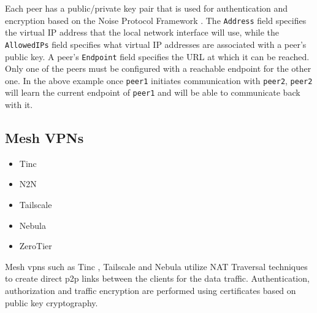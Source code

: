Each peer has a public/private key pair that is used for authentication
and encryption based on the Noise Protocol Framework
\autocite{noiseDocs}. The \texttt{Address} field specifies the virtual
IP address that the local network interface will use, while the
\texttt{AllowedIPs} field specifies what virtual IP addresses are
associated with a peer's public key. A peer's \texttt{Endpoint} field
specifies the URL at which it can be reached. Only one of the peers must
be configured with a reachable endpoint for the other one. In the above
example once \texttt{peer1} initiates communication with \texttt{peer2},
\texttt{peer2} will learn the current endpoint of \texttt{peer1} and
will be able to communicate back with it.

\hypertarget{thesis__020-related-work.md__mesh-vpns}{%
\subsection{Mesh VPNs}\label{thesis__020-related-work.md__mesh-vpns}}

\begin{itemize}
\tightlist
\item
  Tinc
\item
  N2N
\item
  Tailscale
\item
  Nebula
\item
  ZeroTier
\end{itemize}

Mesh \glspl{vpn} such as Tinc \autocite{tincDocs}, Tailscale
\autocite{tailscaleDocs} and Nebula \autocite{nebulaDocs} utilize NAT
Traversal techniques to create direct \gls{p2p} links between the
clients for the data traffic. Authentication, authorization and traffic
encryption are performed using certificates based on public key
cryptography.

